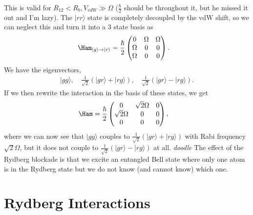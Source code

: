 \documentclass[lasers.tex]{subfiles}
\begin{document}
This is valid for $R_{12}<R_b,V_{vdW}\gg\Omega$ ($\frac{\hbar}{2}$ should be throughout it, but he missed it out and I'm lazy).
The $|rr\rangle$ state is completely decoupled by the vdW shift, so we can neglect this and turn it into a 3 state basis as
\begin{align}
    \Ham_{|g\rangle\to|r\rangle} &= \frac{\hbar}{2}\begin{pmatrix} 0&\Omega&\Omega\\\Omega&0&0\\\Omega&0&0\end{pmatrix}.
\end{align}
We have the eigenvectors,
\begin{align*}
    |gg\rangle, \quad \frac{1}{\sqrt{2}}\left(|gr\rangle+|rg\rangle\right),\quad \frac{1}{\sqrt{2}}\left(|gr\rangle-|rg\rangle\right).
\end{align*}
If we then rewrite the interaction in the basis of these states, we get
\begin{align}
    \Ham &= \frac{\hbar}{2}\begin{pmatrix} 0 & \sqrt{2}\Omega & 0 \\\sqrt{2}\Omega & 0 & 0 \\ 0 & 0 & 0\end{pmatrix},
\end{align}
where we can now see that $|gg\rangle$ couples to $\frac{1}{\sqrt{2}}(|gr\rangle+|rg\rangle)$ with Rabi frequency $\sqrt{2}\Omega$, but it does not couple to $\frac{1}{\sqrt{2}}(|gr\rangle-|rg\rangle)$ at all.
\emph{doodle}
The effect of the Rydberg blockade is that we excite an entangled Bell state where only one atom is in the Rydberg state but we do not know (and cannot know) which one. 

\chapter{Rydberg Interactions}
\end{document}

